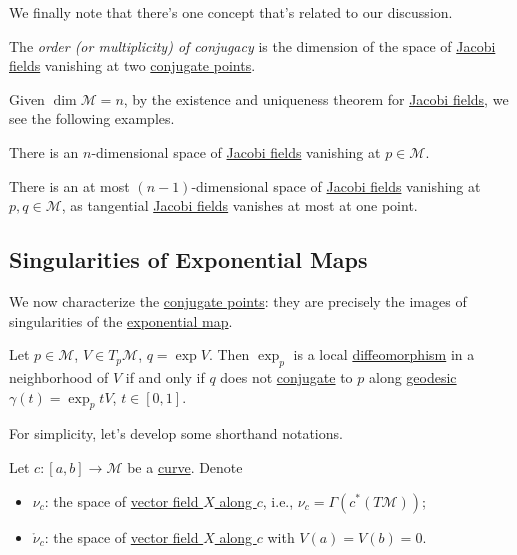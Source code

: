 We finally note that there's one concept that's related to our discussion.

\begin{definition}[Order]\label{def:order-of-conjugacy}
	The \emph{order (or multiplicity) of conjugacy} is the dimension of the space of \hyperref[def:Jacobi-field]{Jacobi fields} vanishing at two \hyperref[def:conjugate-point]{conjugate points}.
\end{definition}

Given \(\dim \mathcal{M} = n\), by the existence and uniqueness theorem for \hyperref[def:Jacobi-field]{Jacobi fields}, we see the following examples.
\begin{eg}
	There is an \(n\)-dimensional space of \hyperref[def:Jacobi-field]{Jacobi fields} vanishing at \(p\in \mathcal{M} \).
\end{eg}

\begin{eg}
	There is an at most \((n-1)\)-dimensional space of \hyperref[def:Jacobi-field]{Jacobi fields} vanishing at \(p, q\in \mathcal{M} \), as tangential \hyperref[def:Jacobi-field]{Jacobi fields} vanishes at most at one point.
\end{eg}

\subsection{Singularities of Exponential Maps}
We now characterize the \hyperref[def:conjugate-point]{conjugate points}: they are precisely the images of singularities of the \hyperref[def:exponential-map]{exponential map}.

\begin{proposition}
	Let \(p\in \mathcal{M} \), \(V\in T_p \mathcal{M} \), \(q = \exp V\). Then \(\exp _p\) is a local \hyperref[def:diffeomorphism]{diffeomorphism} in a neighborhood of \(V\) if and only if \(q\) does not \hyperref[def:conjugate-point]{conjugate} to \(p\) along \hyperref[def:geodesic]{geodesic} \(\gamma (t) = \exp _p tV\), \(t\in [0, 1]\).
\end{proposition}

For simplicity, let's develop some shorthand notations.

\begin{notation}
	Let \(c\colon [a, b] \to \mathcal{M} \) be a \hyperref[def:curve]{curve}. Denote
	\begin{itemize}
		\item \(\nu _c\): the space of \hyperref[def:vector-field-along-curve]{vector field \(X\) along \(c\)}, i.e., \(\nu _c = \Gamma (c^{\ast} (T \mathcal{M} ))\);
		\item \(\mathring{\nu }_c\): the space of \hyperref[def:vector-field-along-curve]{vector field \(X\) along \(c\)} with \(V(a) = V(b) = 0\).
	\end{itemize}
\end{notation}

